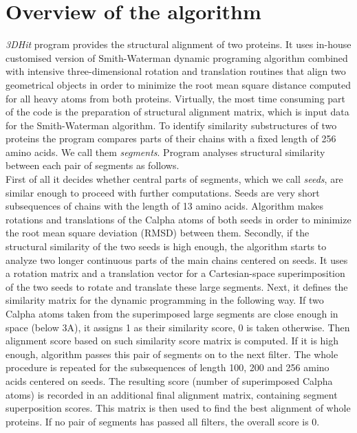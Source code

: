 \documentclass[envcountsame,envcountchap]{svmono}
\newcommand{\prog}{\emph{3DHit}}
\begin{document}
\section{Overview of the algorithm}
\prog{} program provides the structural alignment of two proteins.
It uses in-house customised version of Smith-Waterman dynamic programing
algorithm combined with intensive three-dimensional rotation and translation
routines that align two geometrical objects in order to minimize the root mean square
distance computed for all heavy atoms from both proteins.
Virtually, the most time consuming part of the code is the preparation of structural
alignment matrix, which is input data for the Smith-Waterman algorithm.
To identify similarity substructures of two proteins the program compares
parts of their chains with a fixed length of 256 amino acids.
We call them \emph{segments}.
Program analyses structural similarity between each pair of segments as follows.\\
First of all it decides whether central parts of segments, which we call
\emph{seeds}, are similar enough to proceed with further computations.
Seeds are very short subsequences of chains with the length of 13 amino acids.
Algorithm makes rotations and translations of the Calpha atoms of both seeds in
order to minimize the root mean square deviation (RMSD) between them.
Secondly, if the structural similarity of the two seeds is high enough,
the algorithm starts to analyze two longer continuous parts of the main chains
centered on seeds.
It uses a rotation matrix and a translation vector for a Cartesian-space
superimposition of the two seeds to rotate and translate these large segments.
Next, it defines the similarity matrix for the dynamic programming in the
following way.
If two Calpha atoms taken from the superimposed large segments are close enough
in space (below 3A), it assigns 1 as their similarity score, 0 is taken
otherwise.
Then alignment score based on such similarity score matrix is computed.
If it is high enough, algorithm passes this pair of segments
on to the next filter.
The whole procedure is repeated for the subsequences of length 100, 200 and 256
amino acids centered on seeds.
The resulting score (number of superimposed Calpha atoms) is recorded in an
additional final alignment matrix, containing segment superposition scores.
This matrix is then used to find the best alignment of whole proteins.
If no pair of segments has passed all filters, the overall score is 0.
\end{document}
